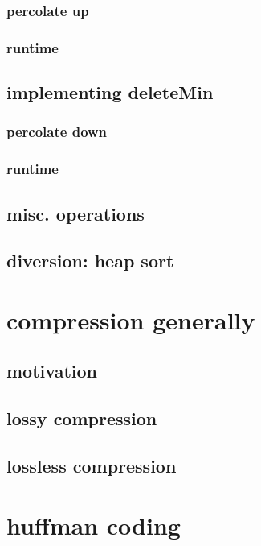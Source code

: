 \subsubsection{percolate up}

\subsubsection{runtime}

\subsection{implementing deleteMin}

\subsubsection{percolate down}

\subsubsection{runtime}

\subsection{misc. operations}

\subsection{diversion: heap sort}

\section{compression generally} 

\subsection{motivation}

\subsection{lossy compression}

\subsection{lossless compression}

\section{huffman coding}

